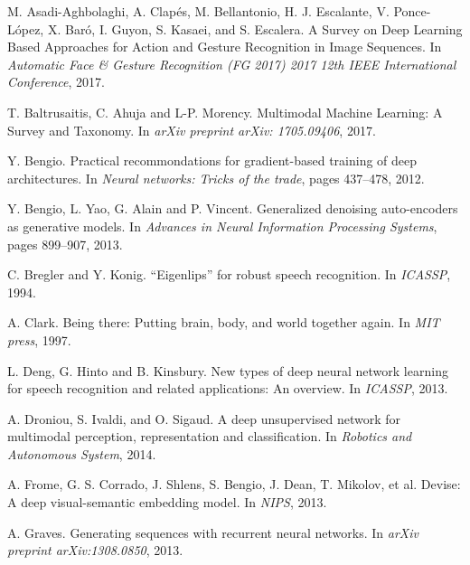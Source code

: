 

\vspace{-0.3em}

\begin{thebibliography}{99}

{\footnotesize

  M. Asadi-Aghbolaghi, A. Clapés, M. Bellantonio, H. J. Escalante, 
  V. Ponce-López, X. Baró, I. Guyon, S. Kasaei, and S. Escalera. 
  A Survey on Deep Learning Based Approaches for Action and Gesture 
  Recognition in Image Sequences. 
  In \textit{Automatic Face \& Gesture Recognition (FG 2017) 2017 12th IEEE
  International Conference}, 2017.

  T. Baltrusaitis, C. Ahuja and L-P. Morency. Multimodal Machine Learning:
  A Survey and Taxonomy. In \textit{arXiv preprint arXiv: 1705.09406}, 2017.

  Y. Bengio. Practical recommondations for gradient-based training of deep
  architectures. In \textit{Neural networks: Tricks of the trade},
  pages 437--478, 2012.

  Y. Bengio, L. Yao, G. Alain and P. Vincent. Generalized denoising
  auto-encoders as generative models. In \textit{Advances in Neural
  Information Processing Systems}, pages 899--907, 2013.

  C. Bregler and Y. Konig. ``Eigenlips'' for robust speech recognition.
  In \textit{ICASSP}, 1994.

  A. Clark. Being there: Putting brain, body, and world together again.
  In \textit{MIT press}, 1997.

  L. Deng, G. Hinto and B. Kinsbury. New types of deep neural network
  learning for speech recognition and related applications: An overview.
  In \textit{ICASSP}, 2013.

  A. Droniou, S. Ivaldi, and O. Sigaud. A deep unsupervised network
  for multimodal perception, representation and classification. In
  \textit{Robotics and Autonomous System}, 2014.

  A. Frome, G. S. Corrado, J. Shlens, S. Bengio, J. Dean,
  T. Mikolov, et al. Devise: A deep visual-semantic embedding model. 
  In \textit{NIPS}, 2013.

  A. Graves. Generating sequences with recurrent neural networks.
  In \textit{arXiv preprint arXiv:1308.0850}, 2013.

}
\end{thebibliography}

